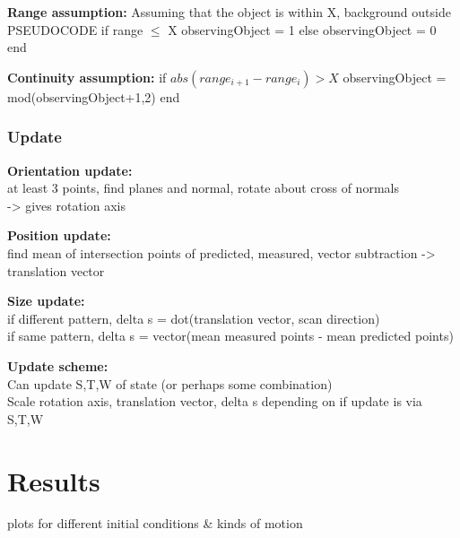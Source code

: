 		\textbf{Range assumption:}
		Assuming that the object is within X, background outside
		PSEUDOCODE
		if range $\leq$ X
			observingObject = 1
		else
			observingObject = 0
		end
		
		\textbf{Continuity assumption:}
		if $abs(range_{i+1}-range_i) > X$
			observingObject = mod(observingObject+1,2)
		end
	\subsubsection{Update}
		\textbf{Orientation update:}\\
			at least 3 points, find planes and normal, rotate about cross of normals\\
			-> gives rotation axis
			
		\textbf{Position update:}\\
			find mean of intersection points of predicted, measured, vector subtraction
			-> translation vector
			
		\textbf{Size update:}\\
			if different pattern, delta s = dot(translation vector, scan direction)\\
			if same pattern, delta s = vector(mean measured points - mean predicted points)
			
		\textbf{Update scheme:}\\
			Can update S,T,W of state (or perhaps some combination)\\
			Scale rotation axis, translation vector, delta s depending on if update is via S,T,W
			
\section{Results}
plots for different initial conditions \& kinds of motion
	
